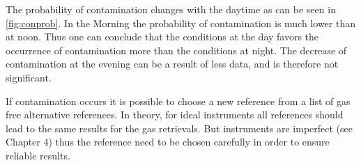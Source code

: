 The probability of contamination changes with the daytime as can be seen in \cref{fig:conprob}. In the Morning the probability of contamination is much lower than at noon. Thus one can conclude that the conditions at the day favors the occurrence of contamination more than the conditions at night. The decrease of contamination at the evening can be a result of less data, and is therefore not significant.

If contamination occurs it is possible to choose a new reference from a list of gas free alternative references. In theory, for ideal instruments all references should lead to
	the same results for the gas retrievals. But instruments are imperfect (see Chapter
	4) thus the reference need to be chosen carefully in order to ensure reliable results.\\
%
\\

